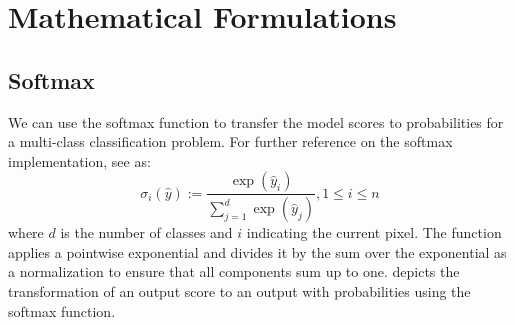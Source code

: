 \chapter{Mathematical Formulations}
\label{chap:mathematical_formulations}
\section{Softmax}
\label{sec:softmax}
We can use the softmax function to transfer the model scores to probabilities for a multi-class classification problem. For further reference on the softmax implementation, see \cite{https://doi.org/10.48550/arxiv.1704.00805} as:
\begin{equation}
    \label{eqn:softmax}
    \sigma_i(\hat{y}):=\frac{\exp(\hat{y}_i)}{\sum_{j=1}^{d}\exp(\hat{y}_j)}, 1\leq i \leq n
\end{equation}
where $d$ is the number of classes and $i$ indicating the current pixel. The function applies a pointwise exponential and divides it by the sum over the exponential as a normalization to ensure that all components sum up to one.  depicts the transformation of an output score to an output with probabilities using the softmax function.

